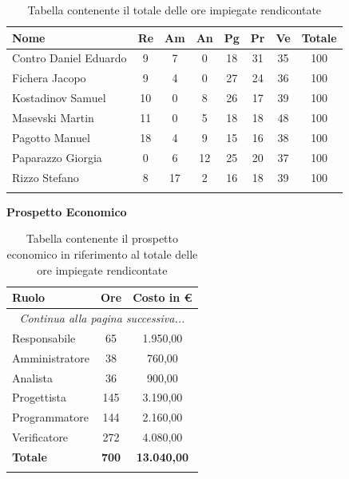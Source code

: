 \documentclass[../piano_di_progetto.tex]{subfiles}
\begin{document}
\begin{center}
	\begin{longtable}{|l|c|c|c|c|c|c|c|}
		\hline
		\rowcolor{lightgray}
		\textbf{Nome} & \textbf{Re} & \textbf{Am} & \textbf{An} & \textbf{Pg}  & \textbf{Pr}   & \textbf{Ve} & \textbf{Totale} \\

		\hline
			Contro Daniel Eduardo & 9 & 7 & 0 & 18 & 31 & 35 & 100 \\
			Fichera Jacopo & 9 & 4 & 0 & 27 & 24 & 36 & 100 \\
			Kostadinov Samuel & 10 & 0 & 8 & 26 & 17 & 39 & 100 \\		
			Masevski Martin & 11 & 0 & 5 & 18 & 18 & 48 & 100 \\
			Pagotto Manuel & 18 & 4 & 9 & 15 & 16 & 38 & 100 \\			
			Paparazzo Giorgia & 0 & 6 & 12 & 25 & 20 & 37 & 100 \\
			Rizzo Stefano & 8 & 17 & 2 & 16 & 18 & 39 & 100 \\
		\hline	
		\rowcolor{white}
		\caption{Tabella contenente il totale delle ore impiegate rendicontate}
	\end{longtable}
\end{center}

\textbf{Prospetto Economico}

\begin{center}
	\begin{longtable}{|l|c|c|}
		\hline
		\rowcolor{lightgray}
		\textbf{Ruolo} & \textbf{Ore} & \textbf{Costo in €}\\
		\hline
		\endhead
		
		\hline
		\multicolumn{3}{|c|}{\emph{Continua alla pagina successiva...}}\\
		\hline
		\endfoot

		\endlastfoot
		Responsabile & 65 & 1.950,00 \\
		Amministratore & 38 & 760,00 \\
		Analista & 36 & 900,00 \\
		Progettista & 145 & 3.190,00 \\
		Programmatore & 144 & 2.160,00 \\
		Verificatore & 272 & 4.080,00 \\
		\hline
		\textbf{Totale} & \textbf{700} & \textbf{13.040,00}\\
		\hline
		\caption{Tabella contenente il prospetto economico in riferimento al totale delle ore impiegate rendicontate}
	\end{longtable}
\end{center}
\end{document}
